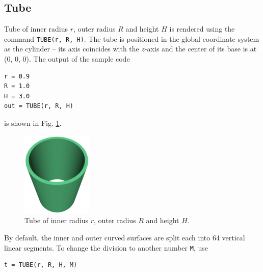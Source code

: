 \subsection{Tube}

Tube of inner radius $r$, outer radius $R$ and height
$H$ is rendered using the command {\tt TUBE(r, R, H)}. 
The tube is positioned in the global coordinate system 
as the cylinder -- its axis coincides with the $z$-axis and 
the center of its base is at (0, 0, 0). 
The output of the sample code\\

\begin{bbox}
\begin{verbatim}
r = 0.9
R = 1.0
H = 3.0
out = TUBE(r, R, H)
\end{verbatim}
\end{bbox}
\vspace{6mm}

\noindent
is shown in Fig. \ref{fig:tube-1}.

\begin{figure}[!ht]
\begin{center}
\includegraphics[width=0.3\textwidth]{img/tube-1.png}
\end{center}
\vspace{-4mm}
\caption{Tube of inner radius $r$, outer radius $R$ and height $H$.}
\label{fig:tube-1}
\end{figure}
\noindent
By default, the inner and outer curved surfaces are split each into 64 vertical 
linear segments. To change the division to another number {\tt M}, use\\

\begin{bbox}
\begin{verbatim}
t = TUBE(r, R, H, M)
\end{verbatim}
\end{bbox}
\vspace{6mm}

